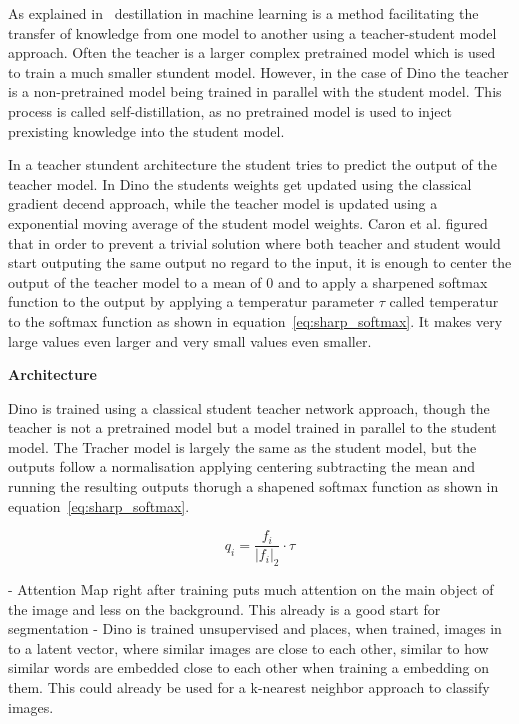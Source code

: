 As explained in~\cite{Phuong2019} destillation in machine learning is a method facilitating the transfer of knowledge from one model to another using a teacher-student model approach.
Often the teacher is a larger complex pretrained model which is used to train a much smaller stundent model. 
However, in the case of Dino the teacher is a non-pretrained model being trained in parallel with the student model. 
This process is called self-distillation, as no pretrained model is used to inject prexisting knowledge into the student model.

In a teacher stundent architecture the student tries to predict the output of the teacher model.
In Dino the students weights get updated using the classical gradient decend approach, while the teacher model is updated using a exponential moving average of the student model weights.
Caron et al. figured that in order to prevent a trivial solution where both teacher and student would start outputing the same output no regard to the input, it is enough to center the output of the teacher model to a mean of 0 and to apply a sharpened softmax function to the output by applying a temperatur parameter $\tau$ called temperatur to the softmax function as shown in equation~\ref{eq:sharp_softmax}. It makes very large values even larger and very small values even smaller.

\textbf{Architecture}

Dino is trained using a classical student teacher network approach, though the teacher is not a pretrained model but a model trained in parallel to the student model.
The Tracher model is largely the same as the student model, but the outputs follow a normalisation applying centering subtracting the mean and running the resulting outputs thorugh a shapened softmax function as shown in equation~\ref{eq:sharp_softmax}.

\begin{equation}
q_{i} = \frac{f_{i}}{|f_{i}|_{2}} \cdot \tau
\label{eq:sharp_softmax}
\end{equation}



- Attention Map right after training puts much attention on the main object of the image and less on the background. This already is a good start for segmentation
- Dino is trained unsupervised and places, when trained, images in to a latent vector, where similar images are close to each other, similar to how similar words are embedded close to each other when training a embedding on them. This could already be used for a k-nearest neighbor approach to classify images.
